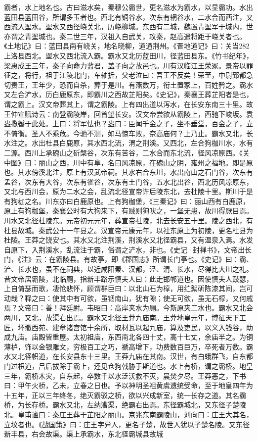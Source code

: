 \documentclass[12pt,UTF8]{ctexbook}
\begin{document}
霸者，水上地名也。古曰滋水矣，秦穆公霸世，更名滋水为霸水，以显霸功。水出蓝田县蓝田谷，所谓多玉者也。西北有铜谷水，次东有辋谷水，二水合而西注，又西流入埿水。埿水又西径峣关北，历峣柳城。东西有二城，魏置青埿军于城内，世亦谓之青埿城也。秦二世三年，汉祖入自武关，攻秦，赵高遣将距于峣关者也。《土地记》曰：蓝田县南有峣关，地名晓柳，道通荆州。《晋地道记》曰：关当282 上洛县西北。埿水又西北流入霸。霸水又北历蓝田川，径蓝田县东。《竹书纪年》，梁惠成王三年，秦子向命力蓝君，盖子向之故邑也。川有汉临江王荣冢。景帝以罪征之，将行，祖于江陵北门，车轴折，父老泣曰：吾王不反矣！荣至，中尉郅都急切责王，王年少，恐而自杀，葬于是川。有燕数万，衔土置冢上，百姓矜之。霸水又左合浐水，历白鹿原东，即霸川之西故芷阳矣。《史记》，秦襄王葬芷阳者是也，谓之霸上。汉文帝葬其上，谓之霸陵。上有四出道以泻水，在长安东南三十里。故王仲宣赋诗云：南登霸陵岸，回首望长安。汉文帝尝欲从霸陵上，西驰下峻坂。袁盎揽辔于此处。上曰：将军怯也？盎曰：臣闻千金之子，坐不垂堂，百金之子，立不倚衡。圣人不乘危。今驰不测，如马惊车败，奈高庙何？上乃止。霸水又北，长水注之。水出杜县白鹿原，其水西北流，渭之荆溪。又西北，左合狗枷川水，水有二源。西川上承磈山之斫槃谷，次东有苦谷，二水合而东北流，径风凉原西。《关中图》曰：丽山之西，川中有阜，名曰风凉原，在磈山之阴，雍州之福地。即是原也。其水傍溪北注，原上有汉武帝祠。其水右合东川，水出南山之石门谷，次东有孟谷，次东有大谷，次东有雀谷，次东有土门谷，五水北出谷，西北历风凉原东，又北与西川会，原为二水之会，乱流北径宣帝许后陵东北，去杜陵十里。斯川于是有狗枷之名。川东亦曰白鹿原也。上有狗枷堡，《三秦记》曰：丽山西有白鹿原，原上有狗枷堡，秦襄公时有大狗来下，有贼则狗吠之，一堡无患，故川得厥目焉。川水又北径杜陵东。元帝初元元年，葬宣帝社陵，北去长安五十里。陵之西北，有杜县故城。秦武公十一年县之。汉宣帝元康元年，以社东原上为初陵，更名杜县为杜陵。王莽之饶安也。其水又北注荆溪，荆溪水又北径霸县，又有温泉入焉。水发自原下，入荆溪水，乱流注于霸，俗谓之浐水，非也。《史记·封禅书》，文帝出长门，《注》云：在霸陵县。有故亭，即《郡国志》所谓长门亭也。《史记》曰：霸、浐、长水也，虽不在祠典，以近咸阳秦、汉都，泾、渭、长水，尽得比大川之礼。昔文帝居霸陵，北临厕，指新丰路示慎夫人曰：此走邯郸道也。因使慎夫人鼓瑟，上自倚瑟而歌，凄怆悲怀，顾谓群巨曰：以北山石为椁，用纻絮斫陈漆其间，岂可动哉？释之曰：使其中有可欲，虽锢南山，犹有隙；使无可欲，虽无石椁，又何戚焉？文帝曰：善！拜廷尉。韦昭曰：高岸夹水为厕。今斯原夹二水也。霸水又北会两川，又北，故渠右出焉。霸水又北径王莽九庙南。王莽地皇元年，博征天下工匠，坏撤西苑、建章诸宫馆十余所，取材瓦以起九庙，算及吏民，以义入钱谷，助成九庙。庙殿皆重屋。太初祖庙，东西南北各四十丈，高十七丈，余庙半之。为铜薄栌，饰以金银雕文，穷极百工之巧，褫高增下，功费数百巨万，卒死者万数。霸水又北径帜道，在长安县东十三里。王莽九庙在其南。汉世，有白蛾群飞，自东都门过枳道，吕后拔除于霸上，还见仓狗戟胁于斯道也。水上有桥，谓之霸桥。地皇三年，霸桥木灾，自东起，卒数千以水泛沃救不灭，晨焚夕尽。王莽恶之，下书曰：甲午火桥，乙未，立春之日也。予以神明圣祖黄虞遗统受命，至于地皇四年为十五年，正以三年终冬，绝灭霸驳之桥，欲以兴成新室，统一长存之道。其名霸桥，为长存桥。霸水又北，左纳漕渠，绝霸右出焉。东径霸城北，又东径子楚陵北。皇甫谧曰：秦庄王葬于芷阳之丽山。京兆东南霸陵山，刘向曰：庄王大其名，立坟者也。《战国策》曰：庄王字异人，更名子楚，故世人犹以子楚名陵。又东径新丰县，右会故渠。渠上承霸水，东北径霸城县故城
\end{document}
